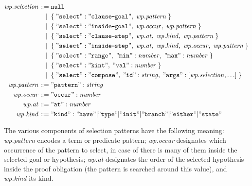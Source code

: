\begin{align*}
    \mathit{wp.selection}
    ::=\;& \mathtt{null} \\
    |\;\;& \mathtt{\{}\; \mathtt{"select":"clause\dash{}goal"},\;
                         \mathit{wp.pattern} \;\mathtt{\}} \\
    |\;\;& \mathtt{\{}\; \mathtt{"select":"inside\dash{}goal"},\;
                         \mathit{wp.occur},\; \mathit{wp.pattern} \;\mathtt{\}} \\
    |\;\;& \mathtt{\{}\; \mathtt{"select":"clause\dash{}step"},\;
                         \mathit{wp.at},\; \mathit{wp.kind},\;
                         \mathit{wp.pattern} \;\mathtt{\}} \\
    |\;\;& \mathtt{\{}\; \mathtt{"select":"inside\dash{}step"},\;
                         \mathit{wp.at},\; \mathit{wp.kind},\;
                         \mathit{wp.occur},\; \mathit{wp.pattern} \;\mathtt{\}} \\
    |\;\;& \mathtt{\{}\; \mathtt{"select":"range"},\;
                         \mathtt{"min"}:\mathit{number},\;
                         \mathtt{"max"}:\mathit{number} \;\mathtt{\}} \\
    |\;\;& \mathtt{\{}\; \mathtt{"select":"kint"},\;
                         \mathtt{"val"}:\mathit{number} \;\mathtt{\}} \\
    |\;\;& \mathtt{\{}\; \mathtt{"select":"compose"},\;
                         \mathtt{"id"}:\mathit{string},\;
                         \mathtt{"args"}:[\mathit{wp.selection},\ldots]
                         \;\mathtt{\}} \\
    \mathit{wp.pattern} ::=\;& \mathtt{"pattern"} : \mathit{string} \\
    \mathit{wp.occur}   ::=\;& \mathtt{"occur"} : \mathit{number} \\
    \mathit{wp.at}      ::=\;& \mathtt{"at"} : \mathit{number} \\
    \mathit{wp.kind}    ::=\;& \mathtt{"kind"} : \mathtt{"have"|"type"|"init"|"branch"|"either"|"state"} \\
\end{align*}

The various components of selection patterns have the following meaning: \textit{wp.pattern} encodes
a term or predicate pattern; \textit{wp.occur} designates which occurrence of the pattern to select,
in case of there is many of them inside the selected goal or hypothesis; \textit{wp.at} designates the
order of the selected hypothesis inside the proof obligation (the pattern is searched around this value),
and \textit{wp.kind} its kind.

